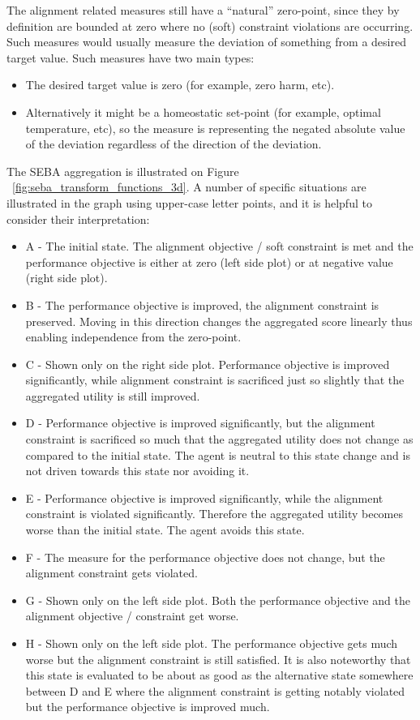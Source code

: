The alignment related measures still have a “natural” zero-point, since they by definition are bounded at zero where no (soft) constraint violations are occurring. %
Such measures would usually measure the deviation of something from a desired target value. Such measures have two main types:
\begin{itemize}
    \item The desired target value is zero (for example, zero harm, etc).
    \item Alternatively it might be a homeostatic set-point (for example, optimal temperature, etc), so the measure is representing the negated absolute value of the deviation regardless of the direction of the deviation.
\end{itemize}
The SEBA aggregation is illustrated on Figure ~\ref{fig:seba_transform_functions_3d}. A number of specific situations are illustrated in the graph using upper-case letter points, and it is helpful to consider their interpretation:
  \begin{itemize}
      \item A - The initial state. The alignment objective / soft constraint is met and the performance objective is either at zero (left side plot) or at negative value (right side plot).
      \item B - The performance objective is improved, the alignment constraint is preserved. Moving in this direction changes the aggregated score linearly thus enabling independence from the zero-point.
      \item C - Shown only on the right side plot. Performance objective is improved significantly, while alignment constraint is sacrificed just so slightly that the aggregated utility is still improved.
      \item D - Performance objective is improved significantly, but the alignment constraint is sacrificed so much that the aggregated utility does not change as compared to the initial state. The agent is neutral to this state change and is not driven towards this state nor avoiding it.
      \item E - Performance objective is improved significantly, while the alignment constraint is violated significantly. Therefore the aggregated utility becomes worse than the initial state. The agent avoids this state.
      \item F - The measure for the performance objective does not change, but the alignment constraint gets violated.
      \item G - Shown only on the left side plot. Both the performance objective and the alignment objective / constraint get worse.
      \item H - Shown only on the left side plot. The performance objective gets much worse but the alignment constraint is still satisfied. It is also noteworthy that this state is evaluated to be about as good as the alternative state somewhere between D and E where the alignment constraint is getting notably violated but the performance objective is improved much.
  \end{itemize}

